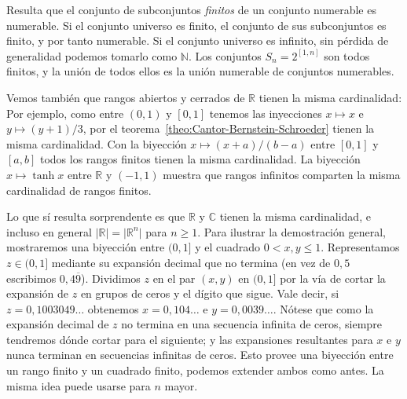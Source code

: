   Resulta que el conjunto
  de subconjuntos \emph{finitos} de un conjunto numerable
  es numerable.
  Si el conjunto universo es finito,
  el conjunto de sus subconjuntos es finito,
  y por tanto numerable.
  Si el conjunto universo es infinito,
  sin pérdida de generalidad podemos tomarlo como \(\mathbb{N}\).
  Los conjuntos \(S_n = 2^{[1, n]}\) son todos finitos,
  y la unión de todos ellos
  es la unión numerable de conjuntos numerables.

  Vemos también que rangos abiertos y cerrados de \(\mathbb{R}\)
  tienen la misma cardinalidad:
  Por ejemplo,
  como entre \((0, 1)\) y \([0, 1]\) tenemos las inyecciones
  \(x \mapsto x\) e \(y \mapsto (y + 1) / 3\),
  por el teorema~\ref{theo:Cantor-Bernstein-Schroeder}
  tienen la misma cardinalidad.
  Con la biyección \(x \mapsto (x + a) / (b - a)\)
  entre \([0, 1]\) y \([a, b]\)
  todos los rangos finitos tienen la misma cardinalidad.
  La biyección \(x \mapsto \tanh x\)
  entre \(\mathbb{R}\) y \((-1, 1)\)
  muestra que rangos infinitos comparten la misma cardinalidad
  de rangos finitos.

  Lo que sí resulta sorprendente es que \(\mathbb{R}\)
  y \(\mathbb{C}\)
  tienen la misma cardinalidad,
  e incluso en general
  \(\lvert \mathbb{R} \rvert
      = \lvert \mathbb{R}^n \rvert\) para \(n \ge 1\).
  Para ilustrar la demostración general,
  mostraremos una biyección entre \((0, 1]\)
  y el cuadrado \(0 < x, y \le 1\).
  Representamos \(z \in (0, 1]\)
  mediante su expansión decimal que no termina
  (en vez de \(0,5\) escribimos \(0,4\overline{9}\)).
  Dividimos \(z\) en el par \((x, y)\) en \((0, 1]\)
  por la vía de cortar la expansión de \(z\)
  en grupos de ceros y el dígito que sigue.
  Vale decir,
  si \(z = 0,1003049\dotso\) obtenemos
  \(x = 0,104\dotso\) e \(y = 0,0039\dotso\).
  Nótese que como la expansión decimal de \(z\)
  no termina en una secuencia infinita de ceros,
  siempre tendremos dónde cortar para el siguiente;
  y las expansiones resultantes para \(x\) e \(y\)
  nunca terminan en secuencias infinitas de ceros.
  Esto provee una biyección
  entre un rango finito y un cuadrado finito,
  podemos extender ambos como antes.
  La misma idea puede usarse para \(n\) mayor.

